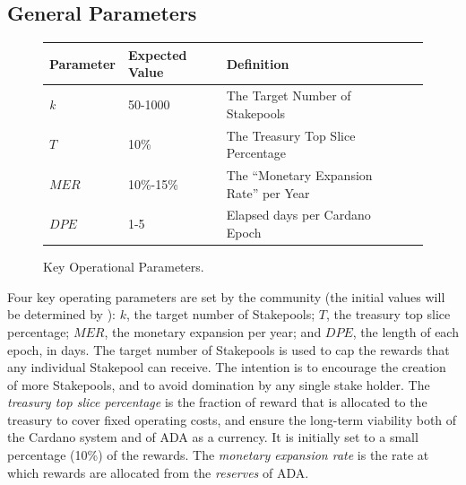 \documentclass[11pt,a4paper,dvipsnames,twosided,final]{article}
\newcommand{\ada}{ADA{}}
\newcommand{\cardano}[1]{Cardano}
\begin{document}
\newpage
\subsection{General Parameters}

\begin{figure}[h!]
\begin{center}
\begin{tabular}{||l|l|p{10cm}|l||}
  \hline \hline
\textbf{Parameter} & \textbf{Expected Value} & \textbf{Definition} \\\hline
\emph{k} & 50-1000 & The Target Number of Stakepools \\\hline
$T$ & 10\% & The Treasury Top Slice Percentage \\\hline
$\textit{MER}$ & 10\%-15\% &  The ``Monetary Expansion Rate'' per Year \\\hline
$\textit{DPE}$ & 1-5 &  Elapsed days per \cardano{} Epoch \\\hline
  \hline
\end{tabular}
\end{center}
\caption{Key Operational Parameters.}
\end{figure}

\noindent
Four key operating parameters are set by the community (the initial values will be determined by \IOHK):
$k$, the target number of Stakepools;
$T$, the treasury top slice percentage;
$\textit{MER}$, the monetary expansion per year;
and
$\textit{DPE}$, the length of each epoch, in days.
%
The target number of Stakepools is used to cap the rewards that any individual Stakepool can receive. The intention is to encourage the creation of more Stakepools, and to avoid domination by any single stake holder.
The \emph{treasury top slice percentage} is the fraction of reward that is allocated to the treasury to cover fixed operating costs, and
ensure the long-term viability both of the \cardano{} system and of \ada{} as a currency.  It is initially set to a small percentage (10\%) of the rewards.
The \emph{monetary expansion rate} is the rate at which rewards are allocated from the \emph{reserves} of \ada{}.
\end{document}
